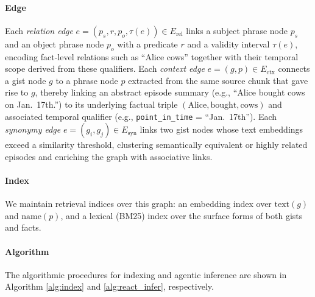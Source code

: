 \documentclass{article} %
\begin{document}
\paragraph{Edge}
Each \textit{relation edge} $e=(p_s, r, p_o, \tau(e)) \in E_{\text{rel}}$ links a subject phrase node $p_s$ and an object phrase node $p_o$ with a predicate $r$ and a validity interval $\tau(e)$, encoding fact-level relations such as ``Alice  cows'' together with their temporal scope derived from these qualifiers.
Each \textit{context edge} $e=(g,p) \in E_{\text{ctx}}$ connects a gist node $g$ to a phrase node $p$ extracted from the same source chunk that gave rise to $g$, thereby linking an abstract episode summary (e.g., ``Alice bought cows on Jan.\ 17th.'') to its underlying factual triple $(\text{Alice}, \text{bought}, \text{cows})$ and associated temporal qualifier (e.g., \texttt{point\_in\_time} = ``Jan.\ 17th'').
Each \textit{synonymy edge} $e=(g_i,g_j) \in E_{\text{syn}}$ links two gist nodes whose text embeddings exceed a similarity threshold, clustering semantically equivalent or highly related episodes and enriching the graph with associative links.

\paragraph{Index}
We maintain retrieval indices over this graph: an embedding index over $\text{text}(g)$ and $\text{name}(p)$, and a lexical (BM25) index over the surface forms of both gists and facts.


\paragraph{Algorithm} The algorithmic procedures for indexing and agentic inference are shown in Algorithm \ref{alg:index} and \ref{alg:react_infer}, respectively.
\end{document}
